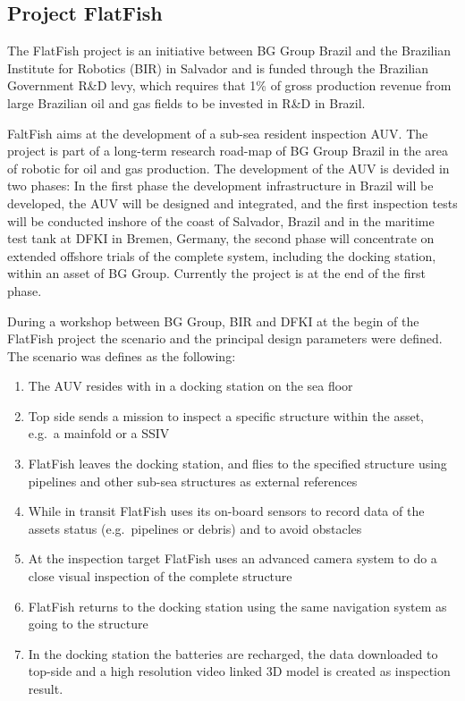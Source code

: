 \documentclass[conference]{IEEEtran}
\begin{document}
\subsection{Project FlatFish}

The FlatFish project is an initiative between BG Group Brazil and the Brazilian Institute
for Robotics (BIR) in Salvador and is funded through the Brazilian Government R\&D levy,
which requires that 1\% of gross production revenue from large Brazilian oil and gas
fields to be invested in R\&D in Brazil.

FaltFish aims at the development of a sub-sea resident inspection AUV. The project is part
of a long-term research road-map of BG Group Brazil in the area of robotic for oil and gas
production. The development of the AUV is devided in two phases: In the first phase the
development infrastructure in Brazil will be developed, the AUV will be designed and
integrated, and the first inspection tests will be conducted inshore of the coast of
Salvador, Brazil and in the maritime test tank at DFKI in Bremen, Germany, the second
phase will concentrate on extended offshore trials of the complete system, including the
docking station, within an asset of BG Group. Currently the project is at the end of the
first phase.

During a workshop between BG Group, BIR and DFKI at the begin of the FlatFish project the
scenario and the principal design parameters were defined. The scenario was defines as the
following:

\begin{enumerate}
    \item The AUV resides with in a docking station on the sea floor
    \item Top side sends a mission to inspect a specific structure within the asset,
        e.g.~a mainfold or a SSIV
    \item FlatFish leaves the docking station, and flies to the specified structure using
        pipelines and other sub-sea structures as external references
    \item While in transit FlatFish uses its on-board sensors to record data of the assets
        status (e.g.~pipelines or debris) and to avoid obstacles
    \item At the inspection target FlatFish uses an advanced camera system to do a close
        visual inspection of the complete structure
    \item FlatFish returns to the docking station using the same navigation system as
        going to the structure
    \item In the docking station the batteries are recharged, the data downloaded to
        top-side and a high resolution video linked 3D model is created as inspection
        result.
\end{enumerate}
\end{document}

